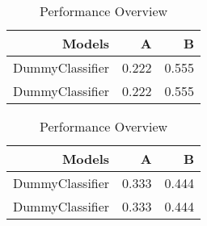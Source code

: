 \begin{table}[ht]
  \caption{ Performance Overview}
  \begin{subtable}{\linewidth}
    \centering
    \footnotesize
    \begin{tabular}{rrr}
      \toprule
      Models
        & A& B  \\
      \midrule
      DummyClassifier& 0.222 & 0.555   \\
      DummyClassifier& 0.222 & 0.555   \\
      \bottomrule
    \end{tabular}
  \end{subtable}
  \par\bigskip
  \begin{subtable}{\linewidth}
    \centering
    \footnotesize
    \begin{tabular}{rrr}
      \toprule
      Models
        & A& B  \\
      \midrule
      DummyClassifier& 0.333 & 0.444   \\
      DummyClassifier& 0.333 & 0.444   \\
      \bottomrule
    \end{tabular}
  \end{subtable}
  \par\bigskip
\end{table}
